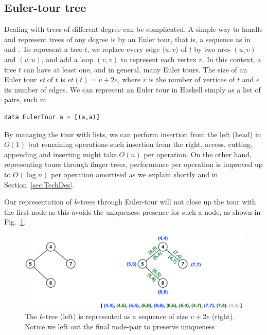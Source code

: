 \subsection{Euler-tour tree} 

Dealing with trees of different degree can be complicated. A simple way to handle and represent trees of any degree is by an Euler tour, that is, a sequence as in \cite{Rand-DynGs-Algos} and \cite{WerneckR-PhD}. To represent a tree $t$, we replace every edge $\langle u,v \rangle$ of $t$ by two arcs $(u,v)$ and $(v,u)$, and add a loop $(v,v)$ to represent each vertex $v$. In this context, a tree $t$ can have at least one, and in general, many Euler tours. The size of an Euler tour \textit{et} of $t$ is $et(t) = v + 2e $, where $v$ is the number of vertices of $t$ and $e$ its number of edges. We can represent an Euler tour in Haskell simply as a list of pairs, such in 

\begin{lstlisting}
data EulerTour a = [(a,a)] 
\end{lstlisting}

By managing the tour with lists, we can perform insertion from the left (head) in $O(1)$ but remaining operations such insertion from the right, access, cutting, appending and inserting might take $O(n)$ per operation.
On the other hand, representing tours through finger trees, performance per operation is improved up to $O(\log n)$ per operation amortised as we explain shortly and in Section~\ref{sec:TechDes}. 

Our representation of $k$-trees through Euler-tour will not close up the tour with the first node as this avoids the uniqueness presence for such a node, as shown in Fig.~\ref{fig:Euler-tour}.

\begin{figure}[H]
\begin{center}
\includegraphics[scale=0.35]{./Images/Euler-tour} 
\end{center}
\caption{The $k$-tree (left) is represented as a sequence of size $v+2e$ (right). Notice we left out the final node-pair to preserve uniqueness}
\label{fig:Euler-tour}
\end{figure}


